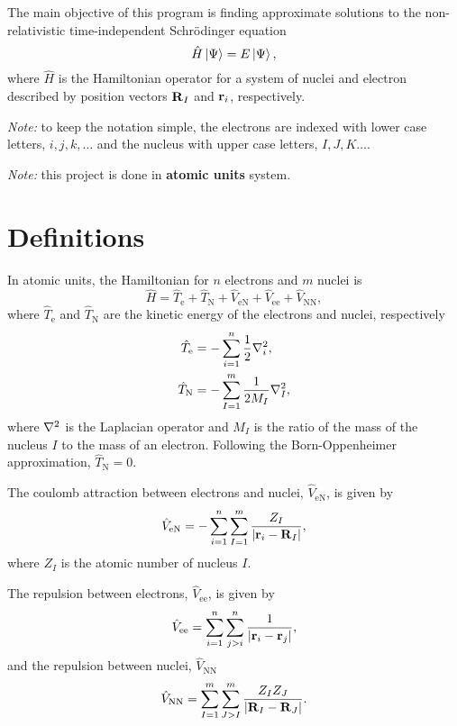 \graphicspath{{./figures/}}

The main objective of this program is finding approximate solutions to the
non-relativistic time-independent Schrödinger equation 
\begin{equation}
    \hat{H} \Ket{\Psi} = E \Ket{\Psi}
    ,
\end{equation}
where $\hat{H}$ is the Hamiltonian operator for a system of nuclei and electron 
described by position vectors $ \boldsymbol{\mathrm{R}}_I$ and $ \boldsymbol{\mathrm{r}}_i$, respectively.

\textit{Note:} to keep the notation simple, the electrons are indexed with lower case
letters, $i,j,k,\ldots$ and the nucleus with upper case letters, $I,J,K\ldots$.

\textit{Note:} this project is done in \textbf{atomic units} system.

\section{Definitions}
In atomic units, the Hamiltonian for $n$ electrons and $m$ nuclei is 
\begin{equation}
    \hat{H} =
    \hat{T}_{\mathrm{e}} +
    \hat{T}_{\mathrm{N}} +
    \hat{V}_{\mathrm{eN}} +
    \hat{V}_{\mathrm{ee}} +
    \hat{V}_{\mathrm{N N}}
    ,
\end{equation}
where $\hat{T}_{\mathrm{e}}$ and $\hat{T}_{\mathrm{N}}$ are the kinetic energy
of the electrons and nuclei, respectively 
\begin{align}
    \hat{T}_{\mathrm{e}} &= - \sum_{i=1}^{n} \frac{1}{2} \laplacian_i, \\
    \hat{T}_{\mathrm{N}} &= - \sum_{I=1}^{m} \frac{1}{2 M_I} \laplacian_I,
\end{align}
where $\laplacian$ is the Laplacian operator and $M_I$ is the ratio of the mass
of the nucleus $I$ to the mass of an electron.
Following the Born-Oppenheimer approximation, $\hat{T}_{\mathrm{N}} = 0$.

The coulomb attraction between electrons and nuclei, $\hat{V}_{\mathrm{eN}}$,
is given by 
\begin{equation}
    \hat{V}_{\mathrm{eN}} =
    - \sum_{i=1}^{n} \sum_{I=1}^{m} \frac{Z_I}{\left| \boldsymbol{\mathrm{r}}_i - \boldsymbol{\mathrm{R}}_I \right|}
    ,
\end{equation}
where $Z_I$ is the atomic number of nucleus $I$.

The repulsion between electrons, $\hat{V}_{\mathrm{ee}}$, is given by 
\begin{equation}
    \hat{V}_{\mathrm{ee}} =
    \sum_{i=1}^{n}  \sum_{j>i}^{n} \frac{1}{\left| \boldsymbol{\mathrm{r}}_i - \boldsymbol{\mathrm{r}}_j \right|}
    ,
\end{equation}
and the repulsion between nuclei, $\hat{V}_{\mathrm{N N}}$
\begin{equation}
    \hat{V}_{\mathrm{N N}} =
    \sum_{I=1}^{m}  \sum_{J>I}^{m} \frac{Z_I Z_J}{\left| \boldsymbol{\mathrm{R}}_I - \boldsymbol{\mathrm{R}}_J \right|}
    .
\end{equation}


